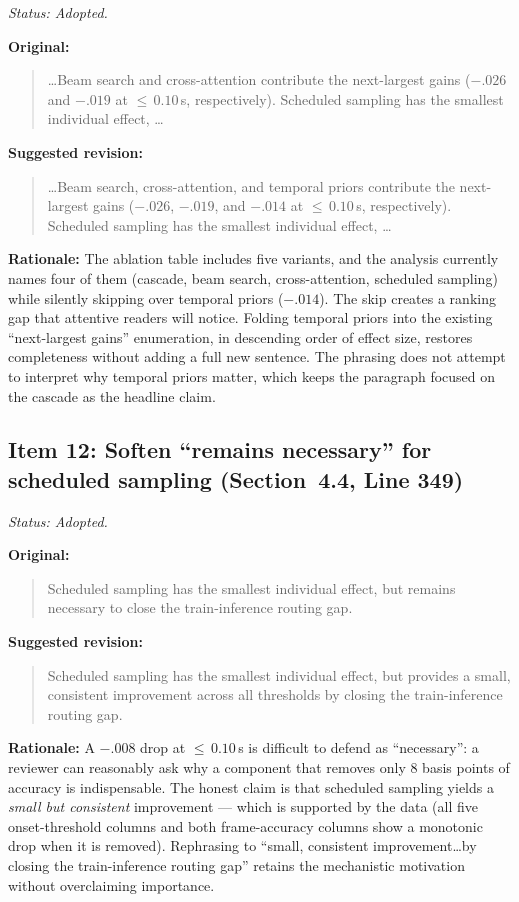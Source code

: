\documentclass{article}
\begin{document}
\textit{Status: Adopted.}

\textbf{Original:}
\begin{quote}
\ldots Beam search and cross-attention contribute the next-largest gains ($-.026$ and $-.019$ at ${\leq}\,0.10$\,s, respectively). Scheduled sampling has the smallest individual effect, \ldots
\end{quote}

\textbf{Suggested revision:}
\begin{quote}
\ldots Beam search, cross-attention, and temporal priors contribute the next-largest gains ($-.026$, $-.019$, and $-.014$ at ${\leq}\,0.10$\,s, respectively). Scheduled sampling has the smallest individual effect, \ldots
\end{quote}

\textbf{Rationale:}
The ablation table includes five variants, and the analysis currently names four of them (cascade, beam search, cross-attention, scheduled sampling) while silently skipping over temporal priors (${-}.014$). The skip creates a ranking gap that attentive readers will notice. Folding temporal priors into the existing ``next-largest gains'' enumeration, in descending order of effect size, restores completeness without adding a full new sentence. The phrasing does not attempt to interpret why temporal priors matter, which keeps the paragraph focused on the cascade as the headline claim.

\subsection*{Item 12: Soften ``remains necessary'' for scheduled sampling (Section~4.4, Line 349)}

\textit{Status: Adopted.}

\textbf{Original:}
\begin{quote}
Scheduled sampling has the smallest individual effect, but remains necessary to close the train-inference routing gap.
\end{quote}

\textbf{Suggested revision:}
\begin{quote}
Scheduled sampling has the smallest individual effect, but provides a small, consistent improvement across all thresholds by closing the train-inference routing gap.
\end{quote}

\textbf{Rationale:}
A $-.008$ drop at ${\leq}\,0.10$\,s is difficult to defend as ``necessary'': a reviewer can reasonably ask why a component that removes only 8 basis points of accuracy is indispensable. The honest claim is that scheduled sampling yields a \emph{small but consistent} improvement --- which is supported by the data (all five onset-threshold columns and both frame-accuracy columns show a monotonic drop when it is removed). Rephrasing to ``small, consistent improvement\ldots by closing the train-inference routing gap'' retains the mechanistic motivation without overclaiming importance.
\end{document}
